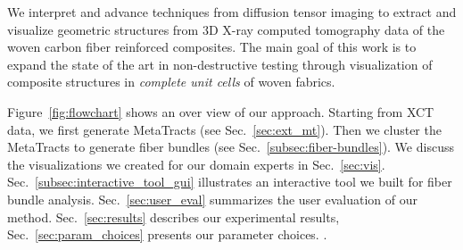We interpret and advance techniques from diffusion tensor imaging to extract and visualize geometric structures from 3D X-ray computed tomography data of the woven carbon fiber reinforced composites. The main goal of this work is to expand the state of the art in non-destructive testing through visualization of composite structures in \textit{complete unit cells} of woven fabrics.

Figure~\ref{fig:flowchart} shows an over view of our approach.
Starting from XCT data, we first generate MetaTracts (see Sec.~\ref{sec:ext_mt}). Then we cluster the MetaTracts to generate fiber bundles (see Sec.~\ref{subsec:fiber-bundles}). We discuss the visualizations we created for our domain experts in Sec.~\ref{sec:vis}. Sec.~\ref{subsec:interactive_tool_gui} illustrates an interactive tool we  built for fiber bundle analysis. 
Sec.~\ref{sec:user_eval} summarizes the user evaluation of our method. Sec.~\ref{sec:results} describes our experimental results, Sec.~\ref{sec:param_choices} presents our parameter choices. .  
